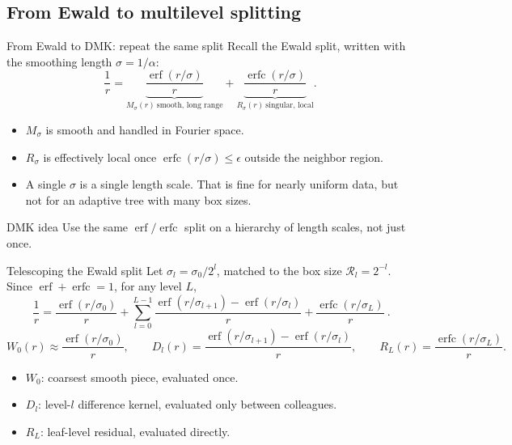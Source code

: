 \documentclass[aspectratio=169,11pt]{beamer}
\newcommand{\cR}{\mathcal{R}}
\DeclareMathOperator{\erf}{erf}
\DeclareMathOperator{\erfc}{erfc}
\begin{document}
\subsection{From Ewald to multilevel splitting}

\begin{frame}{From Ewald to DMK: repeat the same split}
\small
Recall the Ewald split, written with the smoothing length \(\sigma=1/\alpha\):
\[
  \frac1r=\underbrace{\frac{\erf(r/\sigma)}{r}}_{M_\sigma(r)\ \text{smooth, long range}}
  +\underbrace{\frac{\erfc(r/\sigma)}{r}}_{R_\sigma(r)\ \text{singular, local}} .
\]
\begin{itemize}
  \item \(M_\sigma\) is smooth and handled in Fourier space.
  \item \(R_\sigma\) is effectively local once
  \(\erfc(r/\sigma)\le\epsilon\) outside the neighbor region.
  \item A single \(\sigma\) is a single length scale.  That is fine for
  nearly uniform data, but not for an adaptive tree with many box sizes.
\end{itemize}
\begin{block}{DMK idea}
Use the same \(\erf/\erfc\) split on a hierarchy of length scales, not just once.
\end{block}
\end{frame}

\begin{frame}{Telescoping the Ewald split}
\small
Let \(\sigma_l=\sigma_0/2^l\), matched to the box size
\(\cR_l=2^{-l}\).  Since \(\erf+\erfc=1\), for any level \(L\),
\[
  \boxed{\ \frac1r
  =\frac{\erf(r/\sigma_0)}{r}
  +\sum_{l=0}^{L-1}\frac{\erf(r/\sigma_{l+1})-\erf(r/\sigma_l)}{r}
  +\frac{\erfc(r/\sigma_L)}{r}\ } .
\]
\[
  W_0(r)\approx \frac{\erf(r/\sigma_0)}{r},\qquad
  D_l(r)=\frac{\erf(r/\sigma_{l+1})-\erf(r/\sigma_l)}{r},\qquad
  R_L(r)=\frac{\erfc(r/\sigma_L)}{r}.
\]
\begin{itemize}
  \item \(W_0\): coarsest smooth piece, evaluated once.
  \item \(D_l\): level-\(l\) difference kernel, evaluated only between colleagues.
  \item \(R_L\): leaf-level residual, evaluated directly.
\end{itemize}
\end{frame}
\end{document}
